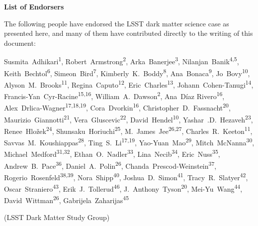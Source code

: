 
\begin{center}
  {\Large \bf List of Endorsers}
\end{center}
\bigskip

The following people have endorsed the LSST dark matter science case as presented here, and many of them have contributed directly to the writing of this document:

\def\altaffilmark#1{\textsuperscript{#1}}
\def\affil#1{\noindent #1 \\}

\normalsize
\begin{raggedright}


Susmita~Adhikari\altaffilmark{1},
Robert~Armstrong\altaffilmark{2},
Arka~Banerjee\altaffilmark{3},
Nilanjan~Banik\altaffilmark{4,5},
Keith~Bechtol\altaffilmark{6},
Simeon~Bird\altaffilmark{7},
Kimberly~K.~Boddy\altaffilmark{8},
Ana~Bonaca\altaffilmark{9},
Jo~Bovy\altaffilmark{10},
Alyson~M.~Brooks\altaffilmark{11},
Regina~Caputo\altaffilmark{12},
Eric~Charles\altaffilmark{13},
Johann~Cohen-Tanugi\altaffilmark{14},
Francis-Yan~Cyr-Racine\altaffilmark{15,16},
William~A.~Dawson\altaffilmark{2},
Ana~D\'{i}az Rivero\altaffilmark{16},
Alex~Drlica-Wagner\altaffilmark{17,18,19},
Cora~Dvorkin\altaffilmark{16},
Christopher~D.~Fassnacht\altaffilmark{20},
Maurizio~Giannotti\altaffilmark{21},
Vera~Gluscevic\altaffilmark{22},
David~Hendel\altaffilmark{10},
Yashar~.D.~Hezaveh\altaffilmark{23},
Renee~Hlo\v{z}ek\altaffilmark{24},
Shunsaku~Horiuchi\altaffilmark{25},
M.~James~Jee\altaffilmark{26,27},
Charles~R.~Keeton\altaffilmark{11},
Savvas~M.~Koushiappas\altaffilmark{28},
Ting~S.~Li\altaffilmark{17,19},
Yao-Yuan~Mao\altaffilmark{29},
Mitch~McNanna\altaffilmark{30},
Michael~Medford\altaffilmark{31,32},
Ethan~O.~Nadler\altaffilmark{33},
Lina~Necib\altaffilmark{34},
Eric~Nuss\altaffilmark{35},
Andrew~B.~Pace\altaffilmark{36},
Daniel~A.~Polin\altaffilmark{26},
Chanda~Prescod-Weinstein\altaffilmark{37},
Rogerio~Rosenfeld\altaffilmark{38,39},
Nora~Shipp\altaffilmark{40},
Joshua~D.~Simon\altaffilmark{41},
Tracy~R.~Slatyer\altaffilmark{42},
Oscar~Straniero\altaffilmark{43},
Erik~J.~Tollerud\altaffilmark{46},
J.~Anthony~Tyson\altaffilmark{20},
Mei-Yu~Wang\altaffilmark{44},
David~Wittman\altaffilmark{26},
Gabrijela~Zaharijas\altaffilmark{45}
\begin{center}
(LSST Dark Matter Study Group)
\end{center}


\end{raggedright}

